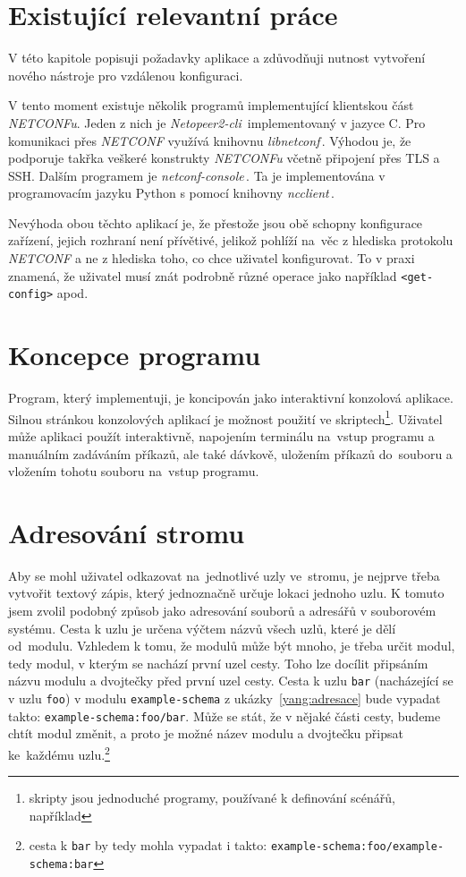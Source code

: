 \documentclass[thesis=B,czech,hidelinks]{FITthesis}[2019/03/06]
\begin{document}
\section{Existující relevantní práce}\label{existing}
V této kapitole popisuji požadavky aplikace a zdůvodňuji nutnost vytvoření nového nástroje pro vzdálenou konfiguraci.

V tento moment existuje několik programů implementující klientskou část \textit{NETCONFu}. Jeden z nich je \textit{Netopeer2-cli}\,\cite{netopeer} implementovaný v jazyce C. Pro komunikaci přes \textit{NETCONF} využívá knihovnu \textit{libnetconf}\,\cite{libnetconf}. Výhodou je, že podporuje takřka veškeré konstrukty \textit{NETCONFu} včetně připojení přes TLS a SSH\@. Dalším programem je \textit{netconf-console}\,\cite{netconf-console}. Ta je implementována v programovacím jazyku Python s pomocí knihovny \textit{ncclient}\,\cite{ncclient}.

Nevýhoda obou těchto aplikací je, že přestože jsou obě schopny konfigurace zařízení, jejich rozhraní není přívětivé, jelikož pohlíží na~věc z hlediska protokolu \textit{NETCONF} a ne z hlediska toho, co chce uživatel konfigurovat. To v praxi znamená, že uživatel musí znát podrobně různé operace jako například \texttt{<get-config>} apod.


\section{Koncepce programu}
Program, který implementuji, je koncipován jako interaktivní konzolová aplikace. Silnou stránkou konzolových aplikací je možnost použití ve skriptech\footnote{skripty jsou jednoduché programy, používané k definování scénářů, například }. Uživatel může aplikaci použít interaktivně, napojením terminálu na~vstup programu a manuálním zadáváním příkazů, ale také dávkově, uložením příkazů do~souboru a vložením tohotu souboru na~vstup programu.

\section{Adresování stromu}
Aby se mohl uživatel odkazovat na~jednotlivé uzly ve~stromu, je nejprve třeba vytvořit textový zápis, který jednoznačně určuje lokaci jednoho uzlu. K tomuto jsem zvolil podobný způsob jako adresování souborů a adresářů v souborovém systému. Cesta k uzlu je určena výčtem názvů všech uzlů, které je dělí od~modulu. Vzhledem k tomu, že modulů může být mnoho, je třeba určit  modul, tedy modul, v kterým se nachází první uzel cesty. Toho lze docílit připsáním názvu modulu a dvojtečky před první uzel cesty. Cesta k uzlu \texttt{bar} (nacházející se v uzlu \texttt{foo}) v modulu \texttt{example-schema} z ukázky~\ref{yang:adresace} bude vypadat takto: \texttt{example-schema:foo/bar}. Může se stát, že v nějaké části cesty, budeme chtít  modul změnit, a proto je možné název modulu a dvojtečku připsat ke~každému uzlu.\footnote{cesta k \texttt{bar} by tedy mohla vypadat i takto: \texttt{example-schema:foo/example-schema:bar}}
\end{document}

